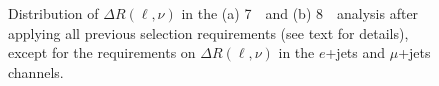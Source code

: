\begin{figure}[h!bt]\begin{center}
        \caption[bla]{Distribution of $\Delta R(\ell,\nu)$ in the (a) 7~\tev\ and
        (b) 8~\tev\ analysis after applying all previous selection requirements (see text for details),
        except for the requirements on $\Delta R(\ell,\nu)$ in the
        $e$+jets and $\mu$+jets channels.
        \label{fig:78tevDRlnu}}
\end{center}\end{figure}
